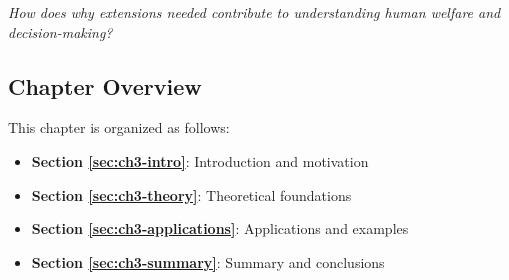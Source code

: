 \begin{tcolorbox}[
    colback=red!5!white,
    colframe=red!75!black,
    title={\textbf{Central Question}},
    fonttitle=\bfseries
]
\Large
\centering
\textit{How does why extensions needed contribute to understanding human welfare and decision-making?}
\end{tcolorbox}



\subsection*{Chapter Overview}

This chapter is organized as follows:

\begin{itemize}
\item \textbf{Section \ref{sec:ch3-intro}}: Introduction and motivation
\item \textbf{Section \ref{sec:ch3-theory}}: Theoretical foundations
\item \textbf{Section \ref{sec:ch3-applications}}: Applications and examples
\item \textbf{Section \ref{sec:ch3-summary}}: Summary and conclusions
\end{itemize}




